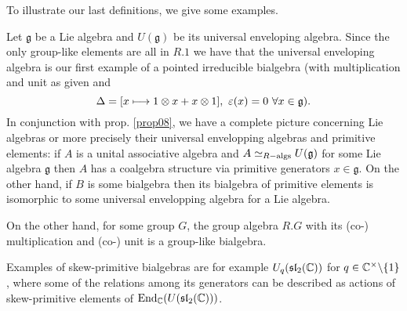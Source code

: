 \bsp \label{exp_bialg} To illustrate our last definitions, we give some examples.
\bn
\item \label{exp_bialg01} Let $\mathfrak{g}$ be a Lie algebra and $U(\mathfrak{g})$ be its universal enveloping algebra. Since the only group-like elements are all in $R.1$ we have that the universal enveloping algebra is our first example of a pointed irreducible bialgebra (with multiplication and unit as given and
$$\Delta = [x \longmapsto 1 \otimes x + x \otimes 1],\ \varepsilon(x) = 0\ \forall x \in \mathfrak{g}).$$
In conjunction with prop. \ref{prop08}, we have a complete picture concerning Lie algebras or more precisely their universal envelopping algebras and primitive elements: if $A$ is a unital associative algebra and $A \simeq_{R-\mathrm{algs}} U(\mathfrak{g})$ for some Lie algebra $\mathfrak{g}$ then $A$ has a coalgebra structure via primitive generators $x \in \mathfrak{g}$. On the other hand, if $B$ is some bialgebra then its bialgebra of primitive elements is isomorphic to some universal envelopping algebra for a Lie algebra.
\item \label{exp_bialg02} On the other hand, for some group $G$, the group algebra $R.G$ with its (co-) multiplication and (co-) unit is a group-like bialgebra.\\
\item \label{exp_bialg03} Examples of skew-primitive bialgebras are for example $U_q(\mathfrak{sl}_2(\mathbb{C}))$ for $q \in \mathbb{C}^\times \backslash \{1\}$, where some of the relations among its generators can be described as actions of skew-primitive elements of $\mathrm{End}_{\mathbb{C}}(U(\mathfrak{sl}_2(\mathbb{C})))$.\\
\en
